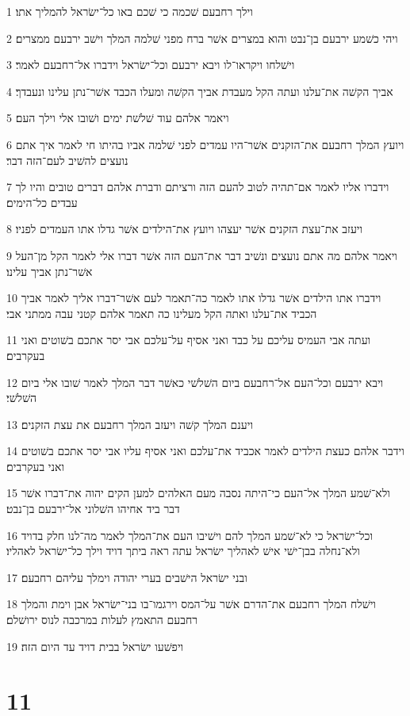 \par 1 וילך רחבעם שׁכמה כי שׁכם באו כל־ישׂראל להמליך אתו׃
\par 2 ויהי כשׁמע ירבעם בן־נבט והוא במצרים אשׁר ברח מפני שׁלמה המלך וישׁב ירבעם ממצרים׃
\par 3 וישׁלחו ויקראו־לו ויבא ירבעם וכל־ישׂראל וידברו אל־רחבעם לאמר׃
\par 4 אביך הקשׁה את־עלנו ועתה הקל מעבדת אביך הקשׁה ומעלו הכבד אשׁר־נתן עלינו ונעבדך׃
\par 5 ויאמר אלהם עוד שׁלשׁת ימים ושׁובו אלי וילך העם׃
\par 6 ויועץ המלך רחבעם את־הזקנים אשׁר־היו עמדים לפני שׁלמה אביו בהיתו חי לאמר איך אתם נועצים להשׁיב לעם־הזה דבר׃
\par 7 וידברו אליו לאמר אם־תהיה לטוב להעם הזה ורציתם ודברת אלהם דברים טובים והיו לך עבדים כל־הימים׃
\par 8 ויעזב את־עצת הזקנים אשׁר יעצהו ויועץ את־הילדים אשׁר גדלו אתו העמדים לפניו׃
\par 9 ויאמר אלהם מה אתם נועצים ונשׁיב דבר את־העם הזה אשׁר דברו אלי לאמר הקל מן־העל אשׁר־נתן אביך עלינו׃
\par 10 וידברו אתו הילדים אשׁר גדלו אתו לאמר כה־תאמר לעם אשׁר־דברו אליך לאמר אביך הכביד את־עלנו ואתה הקל מעלינו כה תאמר אלהם קטני עבה ממתני אבי׃
\par 11 ועתה אבי העמיס עליכם על כבד ואני אסיף על־עלכם אבי יסר אתכם בשׁוטים ואני בעקרבים׃
\par 12 ויבא ירבעם וכל־העם אל־רחבעם ביום השׁלשׁי כאשׁר דבר המלך לאמר שׁובו אלי ביום השׁלשׁי׃
\par 13 ויענם המלך קשׁה ויעזב המלך רחבעם את עצת הזקנים׃
\par 14 וידבר אלהם כעצת הילדים לאמר אכביד את־עלכם ואני אסיף עליו אבי יסר אתכם בשׁוטים ואני בעקרבים׃
\par 15 ולא־שׁמע המלך אל־העם כי־היתה נסבה מעם האלהים למען הקים יהוה את־דברו אשׁר דבר ביד אחיהו השׁלוני אל־ירבעם בן־נבט׃
\par 16 וכל־ישׂראל כי לא־שׁמע המלך להם וישׁיבו העם את־המלך לאמר מה־לנו חלק בדויד ולא־נחלה בבן־ישׁי אישׁ לאהליך ישׂראל עתה ראה ביתך דויד וילך כל־ישׂראל לאהליו׃
\par 17 ובני ישׂראל הישׁבים בערי יהודה וימלך עליהם רחבעם׃
\par 18 וישׁלח המלך רחבעם את־הדרם אשׁר על־המס וירגמו־בו בני־ישׂראל אבן וימת והמלך רחבעם התאמץ לעלות במרכבה לנוס ירושׁלם׃
\par 19 ויפשׁעו ישׂראל בבית דויד עד היום הזה׃

\chapter{11}


